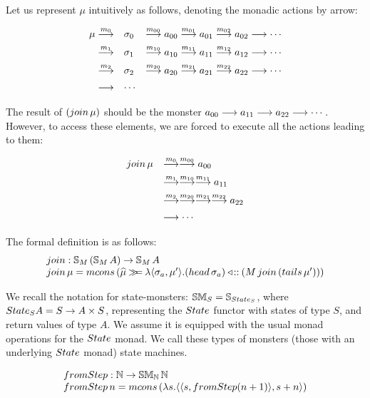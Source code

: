 Let us represent $\mu$ intuitively as follows, denoting the monadic actions by arrow:

$$
\begin{array}[t]{rll}
\mu \stackrel{m_0}{\longrightarrow} 
 & \sigma_0 
 & \stackrel{m_{00}}{\longrightarrow} a_{00} \stackrel{m_{01}}{\longrightarrow} a_{01} \stackrel{m_{02}}{\longrightarrow} a_{02} \stackrel{}{\longrightarrow} \cdots\\[5pt]
\stackrel{m_1}{\longrightarrow} 
 & \sigma_1 
 & \stackrel{m_{10}}{\longrightarrow} a_{10} \stackrel{m_{11}}{\longrightarrow} a_{11} \stackrel{m_{12}}{\longrightarrow} a_{12} \stackrel{}{\longrightarrow} \cdots\\[5pt]
\stackrel{m_2}{\longrightarrow} 
 & \sigma_2
 & \stackrel{m_{20}}{\longrightarrow} a_{20} \stackrel{m_{21}}{\longrightarrow} a_{21} \stackrel{m_{22}}{\longrightarrow} a_{22} \stackrel{}{\longrightarrow} \cdots\\[5pt]
\stackrel{}{\longrightarrow} & \cdots
\end{array}
$$

The result of $(\join\,\mu)$ should be the monster $a_{00} \stackrel{}{\longrightarrow} a_{11}\stackrel{}{\longrightarrow} a_{22} \stackrel{}{\longrightarrow} \cdots$.
However, to access these elements, we are forced to execute all the actions leading to them:

$$
\begin{array}{ll}
\join\,\mu 
& \larrow{m_0}\larrow{m_{00}} a_{00}\\[5pt]
& \larrow{m_1}\larrow{m_{10}}\larrow{m_{11}} a_{11}\\[5pt]
& \larrow{m_2}\larrow{m_{20}}\larrow{m_{21}}\larrow{m_{22}} a_{22}\\[5pt]
& \larrow{} \cdots
\end{array}
$$




The formal definition is as follows:
$$
\begin{array}{l}
\join : \stream{M}\,(\stream{M}\,A) \rightarrow \stream{M}\,A\\
\join\,\mu = \mcons\,(\unc{\mu} \bind \lambda \pair{\sigma_a}{\mu'}.
              (\head\,\sigma_a) \fcons (M\,\join\,(\tails\,\mu')))
\end{array}
$$




We recall the notation for state-monsters: $\stmon{S} = \stream{\state_S}$, where $\state_S A = S \rightarrow A \times S$, representing the $\state$ functor with states of type $S$, and return values of type $A$. 
We assume it is equipped with the usual monad operations for the $\state$ monad. We call these types of monsters (those with an underlying $\state$ monad) state machines.

$$
\begin{array}{l}
\fromstepstr : \nat \rightarrow \stmon{\nat}\,\nat \\
\fromstepstr\, n = \mcons\, (\lambda s. \pair{\pair{s}{\fromstepstr (n + 1)}}{s + n})
\end{array}
$$

